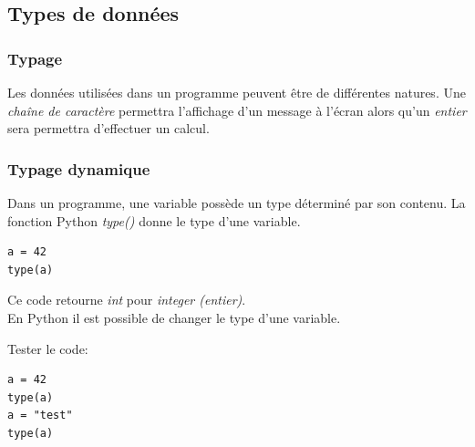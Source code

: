 \documentclass[a4paper,11pt]{article}
\begin{document}
\begin{Form}
\subsection{Types de données}
\subsubsection{Typage}
Les données utilisées dans un programme peuvent être de différentes natures. Une \emph{chaîne de caractère} permettra l'affichage d'un message à l'écran alors qu'un \emph{entier} sera permettra d'effectuer un calcul.
\subsubsection{Typage dynamique}
Dans un programme, une variable possède un type déterminé par son contenu. La fonction Python \emph{type()} donne le type d'une variable.
\begin{lstlisting}
a = 42
type(a)
\end{lstlisting}
Ce code retourne \emph{int} pour \emph{integer (entier)}.\\
En Python il est possible de changer le type d'une variable.
\begin{activite}
Tester le code:
\begin{lstlisting}
a = 42
type(a)
a = "test"
type(a)
\end{lstlisting}
\end{activite}

\end{Form}
\end{document}
